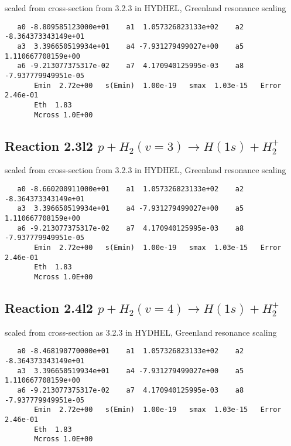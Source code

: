 \documentclass[12pt,dvipdfmx]{article}
\begin{document}
scaled from cross-section from 3.2.3 in HYDHEL, Greenland resonance scaling

\begin{small}\begin{verbatim}
   a0 -8.809585123000e+01    a1  1.057326823133e+02    a2 -8.364373343149e+01
   a3  3.396650519934e+01    a4 -7.931279499027e+00    a5  1.110667708159e+00
   a6 -9.213077375317e-02    a7  4.170940125995e-03    a8 -7.937779949951e-05
       Emin  2.72e+00   s(Emin)  1.00e-19   smax  1.03e-15   Error  2.46e-01
       Eth  1.83
       Mcross 1.0E+00
\end{verbatim}\end{small}


\subsection{
Reaction 2.3l2 $   p + H_2(v=3) \rightarrow H(1s) + H_2^+$}

scaled from cross-section from 3.2.3 in HYDHEL, Greenland resonance scaling

\begin{small}\begin{verbatim}
   a0 -8.660200911000e+01    a1  1.057326823133e+02    a2 -8.364373343149e+01
   a3  3.396650519934e+01    a4 -7.931279499027e+00    a5  1.110667708159e+00
   a6 -9.213077375317e-02    a7  4.170940125995e-03    a8 -7.937779949951e-05
       Emin  2.72e+00   s(Emin)  1.00e-19   smax  1.03e-15   Error  2.46e-01
       Eth  1.83
       Mcross 1.0E+00
\end{verbatim}\end{small}


\subsection{
Reaction 2.4l2 $   p + H_2(v=4) \rightarrow H(1s) + H_2^+$}

scaled from cross-section as 3.2.3 in HYDHEL, Greenland resonance scaling

\begin{small}\begin{verbatim}
   a0 -8.468190770000e+01    a1  1.057326823133e+02    a2 -8.364373343149e+01
   a3  3.396650519934e+01    a4 -7.931279499027e+00    a5  1.110667708159e+00
   a6 -9.213077375317e-02    a7  4.170940125995e-03    a8 -7.937779949951e-05
       Emin  2.72e+00   s(Emin)  1.00e-19   smax  1.03e-15   Error  2.46e-01
       Eth  1.83
       Mcross 1.0E+00
\end{verbatim}\end{small}
\end{document}
